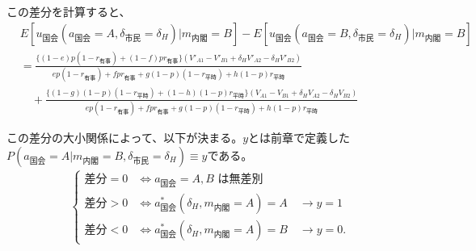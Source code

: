 \documentclass[main.tex]{subfiles}
\begin{document}
\bigskip
この差分を計算すると、
\begin{align*}
    & E[u_{国会}(a_{国会}=A, \delta_{市民}=\delta_H) | m_{内閣} = B  ] - E[u_{国会}(a_{国会}=B, \delta_{市民}=\delta_H) | m_{内閣} = B  ]\\[1em]
    &= \frac{ \{(1-e)p(1-r_{有事}) +  (1-f)pr_{有事}\}(V'_{A1} -V'_{B1} + \delta_H V'_{A2} - \delta_H V'_{B2})  }{ ep(1-r_{有事}) + fpr_{有事} + g(1-p)(1-r_{平時}) + h(1-p)r_{平時} }\\[1em]
    &\quad + \frac{ \{(1-g)(1-p)(1-r_{平時}) + (1-h)(1-p)r_{平時}\}(V_{A1} - V_{B1} + \delta_H V_{A2} - \delta_H V_{B2} ) }{ ep(1-r_{有事}) + fpr_{有事} + g(1-p)(1-r_{平時}) + h(1-p)r_{平時} }
\end{align*}

\bigskip
この差分の大小関係によって、以下が決まる。$y$とは前章で定義した\\
$P(a_{国会} = A| m_{内閣} = B, \delta_{市民} = \delta_H ) \equiv y$である。
\begin{align*}
    \begin{cases}
         \text{差分} = 0 &\Leftrightarrow \text{$a_{\text{国会}} = A, B$ は無差別} \\
         \text{差分} > 0 &\Leftrightarrow a^*_{\text{国会}}(\delta_H, m_{\text{内閣}} = A) = A \quad\rightarrow y = 1 \\
         \text{差分} < 0 &\Leftrightarrow a^*_{\text{国会}}(\delta_H, m_{\text{内閣}} = A) = B \quad\rightarrow y = 0.
    \end{cases}
\end{align*}


\theendnotes
\end{document}
